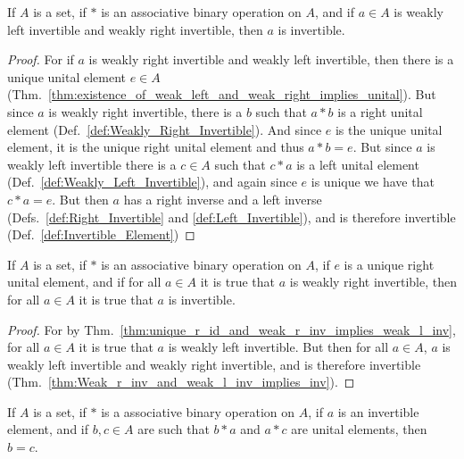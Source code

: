     \begin{theorem}
        \label{thm:Weak_r_inv_and_weak_l_inv_implies_inv}%
        If $A$ is a set, if $*$ is an associative binary operation on $A$, and
        if $a\in{A}$ is weakly left invertible and weakly right invertible, then
        $a$ is invertible.
    \end{theorem}
    \begin{proof}
        For if $a$ is weakly right invertible and weakly left invertible, then
        there is a unique unital element $e\in{A}$
        (Thm.~\ref{thm:existence_of_weak_left_and_weak_right_implies_unital}).
        But since $a$ is weakly right invertible, there is a $b$ such that
        $a*b$ is a right unital element
        (Def.~\ref{def:Weakly_Right_Invertible}). And since $e$ is the unique
        unital element, it is the unique right unital element and thus $a*b=e$.
        But since $a$ is weakly left invertible there is a $c\in{A}$ such that
        $c*a$ is a left unital element (Def.~\ref{def:Weakly_Left_Invertible}),
        and again since $e$ is unique we have that $c*a=e$. But then $a$ has a
        right inverse and a left inverse
        (Defs.~\ref{def:Right_Invertible} and \ref{def:Left_Invertible}), and is
        therefore invertible (Def.~\ref{def:Invertible_Element})
    \end{proof}
    \begin{theorem}
        \label{thm:unqiue_right_unit_and_weak_r_inv_implies_inv}%
        If $A$ is a set, if $*$ is an associative binary operation on $A$, if
        $e$ is a unique right unital element, and if for all $a\in{A}$ it is
        true that $a$ is weakly right invertible, then for all $a\in{A}$ it is
        true that $a$ is invertible.
    \end{theorem}
    \begin{proof}
        For by Thm.~\ref{thm:unique_r_id_and_weak_r_inv_implies_weak_l_inv},
        for all $a\in{A}$ it is true that $a$ is weakly left invertible.
        But then for all $a\in{A}$, $a$ is weakly left invertible and weakly
        right invertible, and is therefore invertible
        (Thm.~\ref{thm:Weak_r_inv_and_weak_l_inv_implies_inv}).
    \end{proof}
    \begin{theorem}
        \label{thm:Assoc_Op_Inverses_are_Unique}%
        If $A$ is a set, if $*$ is a associative binary operation on $A$, if $a$
        is an invertible element, and if $b,c\in{A}$ are such that $b*a$ and
        $a*c$ are unital elements, then $b=c$.
    \end{theorem}
